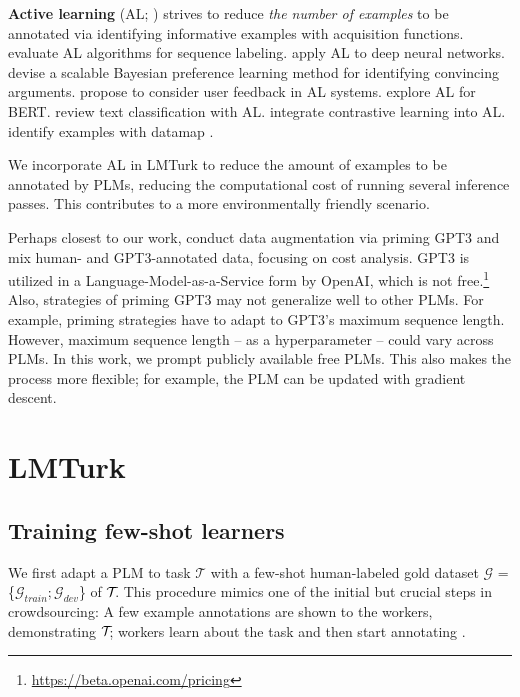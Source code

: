 \documentclass[11pt]{article}
\def\tasksymbol{$\mathcal{T\mkern-5mu}$\xspace}
\def\md{LMTurk\xspace}
\begin{document}
\textbf{Active learning} (AL; \citet{cohn1996active,settles2009active})
strives to reduce \emph{the number of examples}
to be annotated
via identifying 
informative examples
with acquisition functions.
\citet{settles-craven-2008-analysis}
evaluate AL algorithms
for sequence labeling. 
\citet{ALCNN,shen-etal-2017-deep,siddhant-lipton-2018-deep}
apply  AL to deep neural networks.
\citet{simpson-gurevych-2018-finding} devise
a scalable Bayesian
preference learning method for
identifying convincing arguments.
\citet{lee-etal-2020-empowering} propose to consider
user feedback in AL systems.
\citet{ein-dor-etal-2020-active} explore AL
for BERT.
\citet{schroder2020survey} review
text classification with AL.
\citet{liang-etal-2020-alice,margatina2021active}
integrate contrastive learning into AL.
\citet{zhang-plank-2021-cartography-active} identify
examples with datamap \citep{datasetmap}.

We incorporate AL in
\md to
reduce the amount of examples
to be annotated by PLMs,
reducing the
computational cost
of running several
inference passes.
This contributes to a more
environmentally
friendly \citep{strubell-etal-2019-energy,
  schwartz2020green,patterson2021carbon} 
scenario.


Perhaps  closest to our work,
\citet{yoo2021gpt3mix}
conduct data augmentation
via priming GPT3 and
\citet{wang2021want} mix
human- and GPT3-annotated data, focusing
on cost analysis.
GPT3 is utilized in
a Language-Model-as-a-Service form by OpenAI,
which is not free.\footnote{\url{https://beta.openai.com/pricing}}
Also, strategies of priming GPT3 may not
generalize well to other PLMs.
For example, priming strategies have to adapt to GPT3's maximum
sequence length.  However, maximum sequence length -- as a
hyperparameter -- could vary across PLMs.
In this work,
we prompt
publicly available free PLMs.
This also makes the process more flexible; for example,
the PLM can be updated
with gradient descent.




\section{\md}
\subsection{Training few-shot learners}
We first adapt a PLM to
task $\mathcal{T}$ with
a few-shot human-labeled gold dataset
$\mathcal{G}$ = \{$\mathcal{G}_{train}; \mathcal{G}_{dev}$\}
of \tasksymbol.
This procedure mimics
one of the initial but crucial
steps in crowdsourcing:
A few example annotations
are shown to the workers,
demonstrating \tasksymbol; workers
learn about the task and then start
annotating \citep{
snow-etal-2008-cheap,
he-etal-2015-question,
roit-etal-2020-controlled,
trautmann2020fine,
lee2021annotation}.
\end{document}
